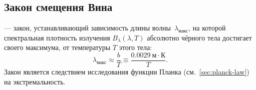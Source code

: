\subsection{Закон смещения Вина}
 --- закон, устанавливающий зависимость длины волны~$\lambda_\text{макс}$, на которой спектральная плотность излучения $B_\lambda(\lambda, T)$ абсолютно чёрного тела достигает своего максимума, от температуры $T$ этого тела:
\begin{equation}
	\lambda_\text{макс} \approx \frac{b}{T} \equiv \frac{0.0029~\text{м} \cdot \text{К}}{T}.
\end{equation}
Закон является следствием исследования функции Планка (см.~\ref{sec:planck-law}) на экстремальность.